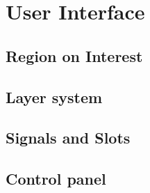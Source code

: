 \section{User Interface}

\subsection{Region on Interest}

\subsection{Layer system}

\subsection{Signals and Slots}

\subsection{Control panel}
